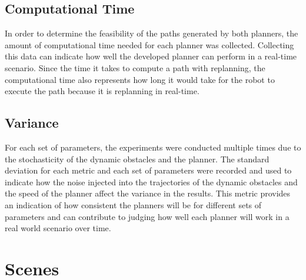 \subsection{Computational Time}

In order to determine the feasibility of the paths generated by both planners,
the amount of computational time needed for each planner was collected.
Collecting this data can indicate how well the developed planner can perform in
a real-time scenario. Since the time it takes to compute a path with
replanning, the computational time also represents how long it would take for
the robot to execute the path because it is replanning in real-time.

\subsection{Variance}

For each set of parameters, the experiments were conducted multiple times due
to the stochasticity of the dynamic obstacles and the planner. The standard
deviation for each metric and each set of parameters were recorded and used to
indicate how the noise injected into the trajectories of the dynamic obstacles
and the speed of the planner affect the variance in the results. This metric
provides an indication of how consistent the planners will be for different
sets of parameters and can contribute to judging how well each planner will
work in a real world scenario over time.

\section{Scenes}


